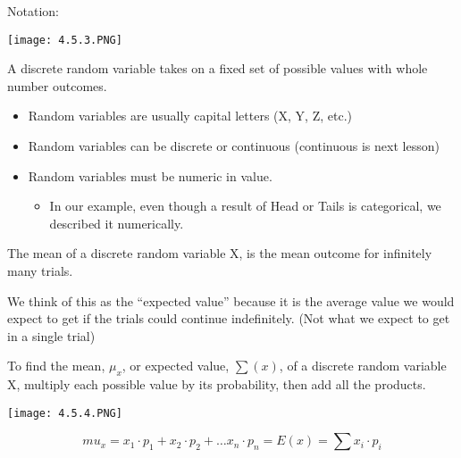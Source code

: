\documentclass[../stats.tex]{subfiles}
\begin{document}
Notation:
\begin{center}
    \texttt{[image: 4.5.3.PNG]}
\end{center}

A discrete random variable takes on a fixed set of possible values with whole number outcomes.
\begin{itemize}
    \item Random variables are usually capital letters (X, Y, Z, etc.)
    \item Random variables can be discrete or continuous (continuous is next lesson)
    \item Random variables must be numeric in value.
    \begin{itemize}
        \item In our example, even though a result of Head or Tails is categorical, we described it numerically.
    \end{itemize}
\end{itemize}

The mean of a discrete random variable X, is the mean outcome for infinitely many trials.

We think of this as the ``expected value'' because it is the average value we would expect to get if the trials could continue indefinitely. (Not what we expect to get in a single trial)

To find the mean, $\mu_x$, or expected value, $\sum(x)$, of a discrete random variable X, multiply each possible value by its probability, then add all the products.
\begin{center}
    \texttt{[image: 4.5.4.PNG]}
\end{center}
\[ mu_x = x_1\cdot p_1+x_2\cdot p_2+\dots x_n\cdot p_n = E(x) = \sum x_i\cdot p_i \]
\end{document}
